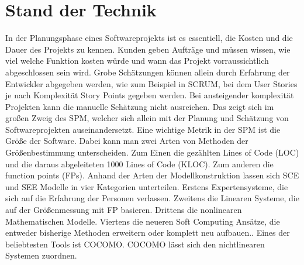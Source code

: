 \section{Stand der Technik}
In der Planungsphase eines Softwareprojekts ist es essentiell, die Kosten und die Dauer des Projekts zu kennen. Kunden geben Aufträge und müssen wissen, wie viel welche Funktion kosten würde und wann das Projekt vorraussichtlich abgeschlossen sein wird. Grobe Schätzungen können allein durch Erfahrung der Entwickler abgegeben werden, wie zum Beispiel in SCRUM, bei dem User Stories je nach Komplexität Story Points gegeben werden. Bei ansteigender komplexität Projekten kann die manuelle Schätzung nicht ausreichen. Das zeigt sich im großen Zweig des SPM, welcher sich allein mit der Planung und Schätzung von Softwareprojekten auseinandersetzt. Eine wichtige Metrik in der SPM ist die Größe der Software. Dabei kann man zwei Arten von Methoden der Größenbestimmung unterscheiden. Zum Einen die gezählten Lines of Code (LOC) und die daraus abgeleiteten 1000 Lines of Code (KLOC). Zum anderen die function points (FPs). Anhand der Arten der Modellkonstruktion lassen sich SCE und SEE Modelle in vier Kategorien unterteilen. Erstens Expertensysteme, die sich auf die Erfahrung der Personen verlassen\cite{Heemstra1992}. Zweitens die Linearen Systeme, die auf der Größenmessung mit FP basieren\cite{Matson1994}. Drittens die nonlinearen Mathematischen Modelle. Viertens die neueren Soft Computing Ansätze, die entweder bisherige Methoden erweitern oder komplett neu aufbauen\cite{Huang2007}.\cite{Huang2006}. Eines der beliebtesten Tools ist COCOMO.\cite{Jain2016} COCOMO lässt sich den nichtlinearen Systemen zuordnen.

